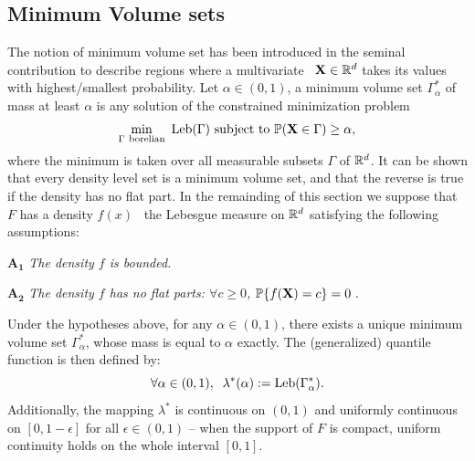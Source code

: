 \subsection{Minimum Volume sets}
\label{resume:mv-set}
The notion of minimum volume set has been introduced in the seminal contribution \cite{Polonik97} to describe regions where a multivariate \rv~$\mathbf X \in \mathbb{R}^d$ takes its values with highest/smallest probability.  Let $\alpha\in (0,1)$, a minimum volume set $\Gamma^*_{\alpha}$ of mass at least $\alpha$ is any solution of the constrained minimization problem
\begin{equation}\label{eq:MV}\min_{\Gamma~ \text{borelian}} ~\text{Leb}(\Gamma) \mbox{~subject to~} \mathbb{P}(\mathbf X \in \Gamma) \ge \alpha,
\end{equation}
where the minimum is taken over all measurable subsets $\Gamma$ of $\mathbb{R}^d$.
It can be shown that every density level set is a minimum volume set, and that the reverse is true if the density has no flat part. %
%
In the remainding of this section we suppose that $F$ has a density $f(x)$ \wrt~the Lebesgue measure on $\mathbb{R}^d$ satisfying the following assumptions:

\noindent $\mathbf{A_1}$ {\it The density $f$ is bounded.}%

\noindent $\mathbf{A_2}$ {\it The density $f$ has no flat parts: $\forall c\geq 0$, $\mathbb{P}\{f(\mathbf X)=c\}=0~.$}

Under the hypotheses above, for any $\alpha\in (0,1)$, there exists a unique minimum volume set $\Gamma_\alpha^*$, whose mass is equal to $\alpha$ exactly.
The (generalized) quantile function is then defined by:
$$
\forall \alpha\in (0,1),\;\; \lambda^*(\alpha) := \text{Leb}(\Gamma^*_{\alpha}).
$$
Additionally, the mapping $\lambda^*$ is continuous on $(0,1)$ and uniformly continuous on $[0,1-\epsilon]$ for all $\epsilon \in (0,1)$ -- when the support of $F$ is compact, uniform continuity holds on the whole interval $[0,1]$.


